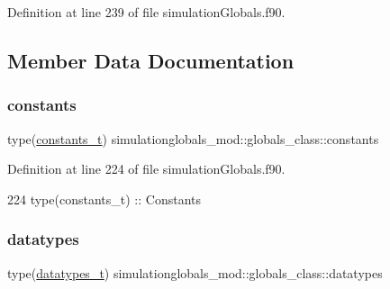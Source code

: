 Definition at line 239 of file simulation\+Globals.\+f90.



\subsection{Member Data Documentation}
\mbox{\label{structsimulationglobals__mod_1_1globals__class_ae5b1d2a8e662ad25456336893c91dd92}} 
\subsubsection{\texorpdfstring{constants}{constants}}
{\footnotesize\ttfamily type(\mbox{\hyperlink{structsimulationglobals__mod_1_1constants__t}{constants\+\_\+t}}) simulationglobals\+\_\+mod\+::globals\+\_\+class\+::constants\hspace{0.3cm}{\ttfamily [private]}}



Definition at line 224 of file simulation\+Globals.\+f90.


\begin{DoxyCode}
224         \textcolor{keywordtype}{type}(constants\_t)   :: Constants
\end{DoxyCode}
\mbox{\label{structsimulationglobals__mod_1_1globals__class_ac8f7c4b1557a471904ea8746043f5472}} 
\subsubsection{\texorpdfstring{datatypes}{datatypes}}
{\footnotesize\ttfamily type(\mbox{\hyperlink{structsimulationglobals__mod_1_1datatypes__t}{datatypes\+\_\+t}}) simulationglobals\+\_\+mod\+::globals\+\_\+class\+::datatypes\hspace{0.3cm}{\ttfamily [private]}}



